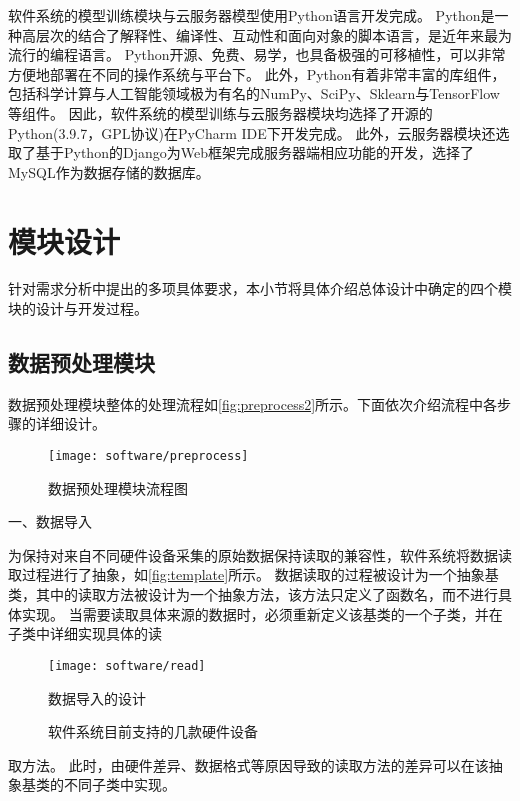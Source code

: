 软件系统的模型训练模块与云服务器模型使用Python语言开发完成。
Python是一种高层次的结合了解释性、编译性、互动性和面向对象的脚本语言，是近年来最为流行的编程语言。
Python开源、免费、易学，也具备极强的可移植性，可以非常方便地部署在不同的操作系统与平台下。
此外，Python有着非常丰富的库组件，包括科学计算与人工智能领域极为有名的NumPy、SciPy、Sklearn与TensorFlow等组件。
因此，软件系统的模型训练与云服务器模块均选择了开源的Python(3.9.7，GPL协议)在PyCharm IDE下开发完成。
此外，云服务器模块还选取了基于Python的Django为Web框架完成服务器端相应功能的开发，选择了MySQL作为数据存储的数据库。

\section{模块设计}

针对需求分析中提出的多项具体要求，本小节将具体介绍总体设计中确定的四个模块的设计与开发过程。
\subsection{数据预处理模块}

数据预处理模块整体的处理流程如\autoref{fig:preprocess2}所示。下面依次介绍流程中各步骤的详细设计。
\begin{figure}[htbp]
    \centering
    \texttt{[image: software/preprocess]}
    \caption{\label{fig:preprocess2}数据预处理模块流程图}
\end{figure}

一、数据导入

为保持对来自不同硬件设备采集的原始数据保持读取的兼容性，软件系统将数据读取过程进行了抽象，如\autoref{fig:template}所示。
数据读取的过程被设计为一个抽象基类，其中的读取方法被设计为一个抽象方法，该方法只定义了函数名，而不进行具体实现。
当需要读取具体来源的数据时，必须重新定义该基类的一个子类，并在子类中详细实现具体的读

\begin{figure}[htbp]
    \centering
    \texttt{[image: software/read]}
    \caption{\label{fig:template}数据导入的设计}
\end{figure}
\begin{figure}[htbp]
    \centering
    \quad
    \quad
    \caption{\label{fig:data_sources}软件系统目前支持的几款硬件设备}
\end{figure}
\noindent
取方法。
此时，由硬件差异、数据格式等原因导致的读取方法的差异可以在该抽象基类的不同子类中实现。

